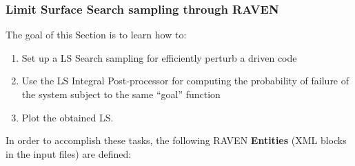 \subsubsection{Limit Surface Search sampling through RAVEN}
\label{subsub:LSsamplingExample}
The goal of this Section is to learn how to:
 \begin{enumerate}
   \item Set up a LS Search sampling for efficiently perturb a driven code
   \item Use the LS Integral Post-processor for computing the probability of failure of the system subject to the same 
   ``goal'' function
   \item Plot the obtained LS.
\end{enumerate}  
In order to accomplish these tasks, the following RAVEN \textbf{Entities} (XML blocks in the input files) are defined:

